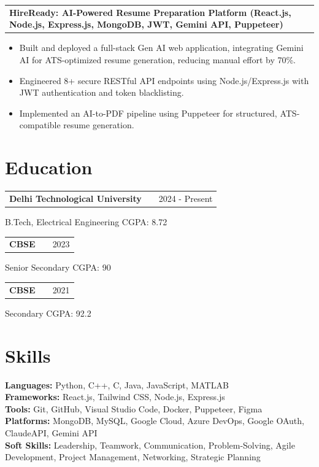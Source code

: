 \documentclass[a4paper,10pt]{article}
\makeatletter
\newenvironment{jobshort}[2]
    {
    \begin{tabularx}{\linewidth}{@{}l X r@{}}
    \textbf{#1} & \hfill &  #2 \\[3.75pt]
    \end{tabularx}
    }
    {
    }
\newenvironment{joblong}[2]
    {
    \begin{tabularx}{\linewidth}{@{}l X r@{}}
    \textbf{#1} & \hfill &  #2 \\[3.75pt]
    \end{tabularx}
    \begin{minipage}[t]{\linewidth}
    \begin{itemize}[nosep,after=\strut, leftmargin=1em, itemsep=3pt,label=--]
    }
    {
    \end{itemize}
    \end{minipage}    
    }
\makeatother
\begin{document}
\begin{joblong}{HireReady: AI-Powered Resume Preparation Platform (React.js, Node.js, Express.js, MongoDB, JWT, Gemini API, Puppeteer)}{}
\item Built and deployed a full-stack Gen AI web application, integrating Gemini AI for ATS-optimized resume generation, reducing manual effort by 70\%.
\item Engineered 8+ secure RESTful API endpoints using Node.js/Express.js with JWT authentication and token blacklisting.
\item Implemented an AI-to-PDF pipeline using Puppeteer for structured, ATS-compatible resume generation.
\end{joblong}
\vspace{3pt}


\section{Education}


\begin{jobshort}{Delhi Technological University}{2024 - Present}
\end{jobshort}
B.Tech, Electrical Engineering \hfill CGPA: 8.72\\[6pt]


\begin{jobshort}{CBSE}{2023}
\end{jobshort}
Senior Secondary \hfill CGPA: 90\\[6pt]


\begin{jobshort}{CBSE}{2021}
\end{jobshort}
Secondary \hfill CGPA: 92.2\\[6pt]


\section{Skills}

\textbf{Languages:} Python, C++, C, Java, JavaScript, MATLAB \\[4pt]
\textbf{Frameworks:} React.js, Tailwind CSS, Node.js, Express.js \\[4pt]
\textbf{Tools:} Git, GitHub, Visual Studio Code, Docker, Puppeteer, Figma \\[4pt]
\textbf{Platforms:} MongoDB, MySQL, Google Cloud, Azure DevOps, Google OAuth, ClaudeAPI, Gemini API \\[4pt]
\textbf{Soft Skills:} Leadership, Teamwork, Communication, Problem-Solving, Agile Development, Project Management, Networking, Strategic Planning \\[4pt]
\end{document}
